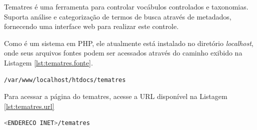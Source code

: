 Tematres é uma ferramenta para controlar vocábulos controlados e taxonomias. Suporta análise e categorização de termos de busca através de metadados, fornecendo uma interface web para realizar este controle.

Como é um sistema em PHP, ele atualmente está instalado no diretório \textit{localhost}, onde seus arquivos fontes podem ser acessados através do caminho exibido na Listagem \ref{lst:tematres.fonte}.
\begin{lstlisting}[language=bash, label=lst:tematres.fonte, caption=Arquivos fontes do tematres.]
    /var/www/localhost/htdocs/tematres
\end{lstlisting}

Para acessar a página do tematres, acesse a URL disponível na Listagem \ref{lst:tematres.url}
\begin{lstlisting}[language=bash, label=lst:tematres.url, caption=Acessando o Tematres.]
    <ENDERECO INET>/tematres
\end{lstlisting}
